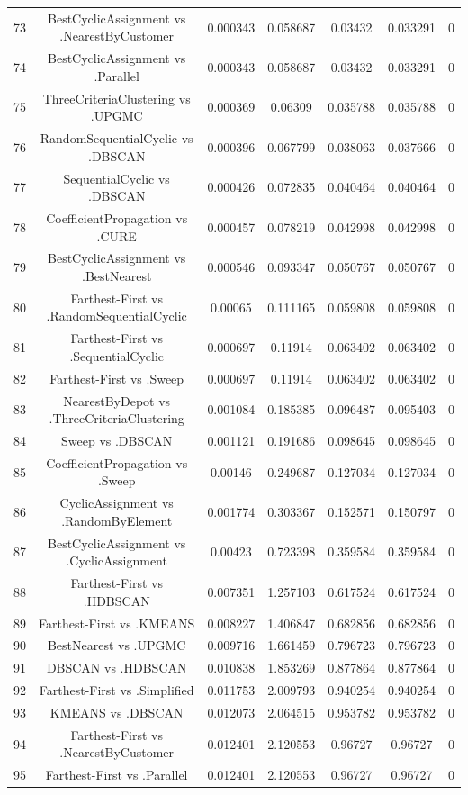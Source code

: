 \documentclass[a4paper,10pt]{article}
\begin{document}
\begin{landscape}
\begin{table}[!htp]
\begin{tabular}{ccccccc}
73&BestCyclicAssignment vs .NearestByCustomer&0.000343&0.058687&0.03432&0.033291&0\\
74&BestCyclicAssignment vs .Parallel&0.000343&0.058687&0.03432&0.033291&0\\
75&ThreeCriteriaClustering vs .UPGMC&0.000369&0.06309&0.035788&0.035788&0\\
76&RandomSequentialCyclic vs .DBSCAN&0.000396&0.067799&0.038063&0.037666&0\\
77&SequentialCyclic vs .DBSCAN&0.000426&0.072835&0.040464&0.040464&0\\
78&CoefficientPropagation vs .CURE&0.000457&0.078219&0.042998&0.042998&0\\
79&BestCyclicAssignment vs .BestNearest&0.000546&0.093347&0.050767&0.050767&0\\
80&Farthest-First vs .RandomSequentialCyclic&0.00065&0.111165&0.059808&0.059808&0\\
81&Farthest-First vs .SequentialCyclic&0.000697&0.11914&0.063402&0.063402&0\\
82&Farthest-First vs .Sweep&0.000697&0.11914&0.063402&0.063402&0\\
83&NearestByDepot vs .ThreeCriteriaClustering&0.001084&0.185385&0.096487&0.095403&0\\
84&Sweep vs .DBSCAN&0.001121&0.191686&0.098645&0.098645&0\\
85&CoefficientPropagation vs .Sweep&0.00146&0.249687&0.127034&0.127034&0\\
86&CyclicAssignment vs .RandomByElement&0.001774&0.303367&0.152571&0.150797&0\\
87&BestCyclicAssignment vs .CyclicAssignment&0.00423&0.723398&0.359584&0.359584&0\\
88&Farthest-First vs .HDBSCAN&0.007351&1.257103&0.617524&0.617524&0\\
89&Farthest-First vs .KMEANS&0.008227&1.406847&0.682856&0.682856&0\\
90&BestNearest vs .UPGMC&0.009716&1.661459&0.796723&0.796723&0\\
91&DBSCAN vs .HDBSCAN&0.010838&1.853269&0.877864&0.877864&0\\
92&Farthest-First vs .Simplified&0.011753&2.009793&0.940254&0.940254&0\\
93&KMEANS vs .DBSCAN&0.012073&2.064515&0.953782&0.953782&0\\
94&Farthest-First vs .NearestByCustomer&0.012401&2.120553&0.96727&0.96727&0\\
95&Farthest-First vs .Parallel&0.012401&2.120553&0.96727&0.96727&0\\

\end{tabular}
\end{table}
\end{landscape}
\end{document}
